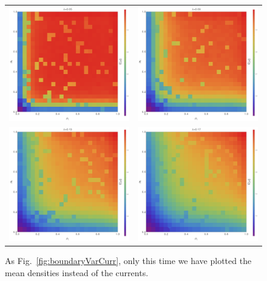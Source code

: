 \begin{figure} \caption[Mean densities observed when varying the boundary densities, fixing $\lambda$,
for different $\lambda$]{As Fig.~\ref{fig:boundaryVarCurr}, only this time we have plotted the mean 
densities instead of the currents.} 
\label{fig:boundaryVarDens}
\begin{center}
\begin{tabular}{c c} 
\includegraphics[width=0.49\linewidth]{numerics/images/concFrames/concDataDens0p05.png} &
\includegraphics[width=0.49\linewidth]{numerics/images/concFrames/concDataDens0p09.png} \\
\includegraphics[width=0.49\linewidth]{numerics/images/concFrames/concDataDens0p13.png} & 
\includegraphics[width=0.49\linewidth]{numerics/images/concFrames/concDataDens0p17.png} \\

\end{tabular}
\end{center}
\end{figure}

